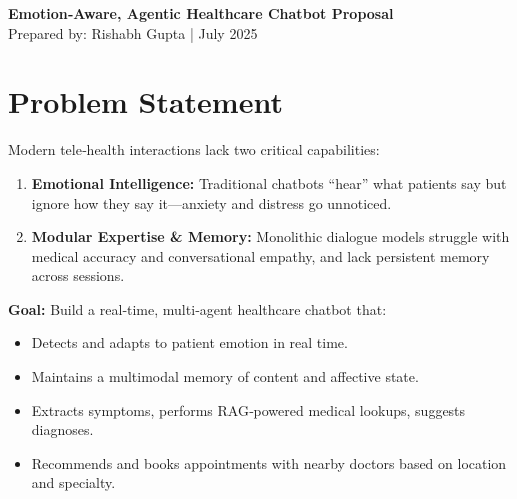 \documentclass[11pt,a4paper]{article}
\begin{document}
\begin{center}
  {\LARGE \bfseries Emotion‐Aware, Agentic Healthcare Chatbot Proposal} \\
  \vspace{0.5em}
  {Prepared by: Rishabh Gupta \quad | \quad July 2025}
\end{center}

\vspace{1em}

\section{Problem Statement}
Modern tele‐health interactions lack two critical capabilities:
\begin{enumerate}[left=0pt,label=\arabic*)]
  \item \textbf{Emotional Intelligence:} Traditional chatbots “hear” what patients say but ignore how they say it—anxiety and distress go unnoticed.
  \item \textbf{Modular Expertise \& Memory:} Monolithic dialogue models struggle with medical accuracy and conversational empathy, and lack persistent memory across sessions.
\end{enumerate}

\textbf{Goal:} Build a real‐time, multi‐agent healthcare chatbot that:
\begin{itemize}[left=0pt]
  \item Detects and adapts to patient emotion in real time.
  \item Maintains a multimodal memory of content and affective state.
  \item Extracts symptoms, performs RAG‐powered medical lookups, suggests diagnoses.
  \item Recommends and books appointments with nearby doctors based on location and specialty.
\end{itemize}
\end{document}
